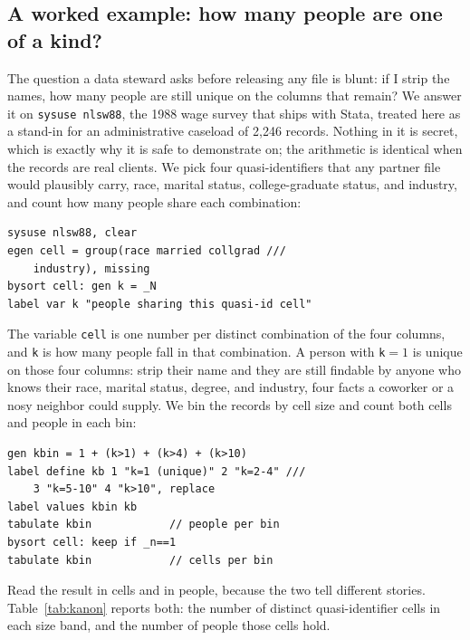 \documentclass[
    a4paper,
    fontsize=10pt,
    twoside=true,
    numbers=noenddot,
]{kaobook}
\begin{document}
\subsection{A worked example: how many people are one of a kind?}\label{sec:kanon}
The question a data steward asks before releasing any file is blunt: if I strip the names, how many people are still unique on the columns that remain? We answer it on \texttt{sysuse nlsw88}, the 1988 wage survey that ships with Stata, treated here as a stand-in for an administrative caseload of 2{,}246 records. Nothing in it is secret, which is exactly why it is safe to demonstrate on; the arithmetic is identical when the records are real clients. We pick four quasi-identifiers that any partner file would plausibly carry, race, marital status, college-graduate status, and industry, and count how many people share each combination:
{\footnotesize
\begin{verbatim}
sysuse nlsw88, clear
egen cell = group(race married collgrad ///
    industry), missing
bysort cell: gen k = _N
label var k "people sharing this quasi-id cell"
\end{verbatim}
}
The variable \texttt{cell} is one number per distinct combination of the four columns, and \texttt{k} is how many people fall in that combination. A person with \texttt{k}${}=1$ is unique on those four columns: strip their name and they are still findable by anyone who knows their race, marital status, degree, and industry, four facts a coworker or a nosy neighbor could supply. We bin the records by cell size and count both cells and people in each bin:
{\footnotesize
\begin{verbatim}
gen kbin = 1 + (k>1) + (k>4) + (k>10)
label define kb 1 "k=1 (unique)" 2 "k=2-4" ///
    3 "k=5-10" 4 "k>10", replace
label values kbin kb
tabulate kbin            // people per bin
bysort cell: keep if _n==1
tabulate kbin            // cells per bin
\end{verbatim}
}
Read the result in cells and in people, because the two tell different stories. Table~\ref{tab:kanon} reports both: the number of distinct quasi-identifier cells in each size band, and the number of people those cells hold.
\end{document}
